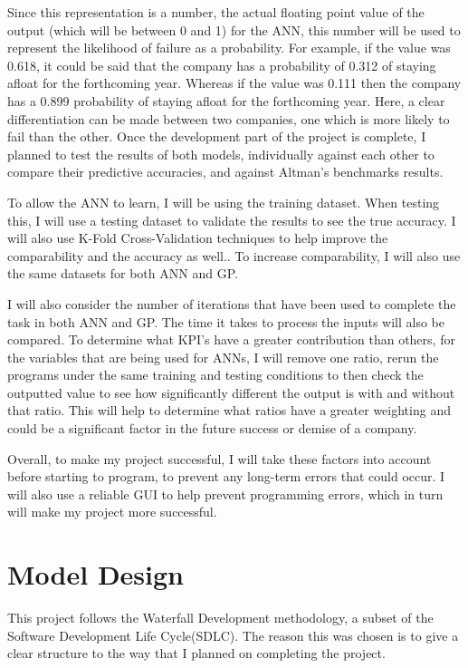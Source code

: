 \documentclass[11pt]{article}
\begin{document}
Since this representation is a number, the actual floating point value of the output (which will be between 0 and 1) for the ANN, this number will be used to represent the likelihood of failure as a probability. For example, if the value was 0.618, it could be said that the company has a probability of 0.312 of staying afloat for the forthcoming year. Whereas if the value was 0.111 then the company has a 0.899 probability of staying afloat for the forthcoming year. Here, a clear differentiation can be made between two companies, one which is more likely to fail than the other.
Once the development part of the project is complete, I planned to test the results of both models, individually against each other to compare their predictive accuracies, and against Altman's benchmarks results.

To allow the ANN to learn, I will be using the training dataset. When testing this, I will use a testing dataset to validate the results to see the true accuracy. I will also use K-Fold Cross-Validation techniques to help improve the comparability and the accuracy as well.. To increase comparability, I will also use the same datasets for both ANN and GP.

I will also consider the number of iterations that have been used to complete the task in both ANN and GP. The time it takes to process the inputs will also be compared. To determine what KPI's have a greater contribution than others, for the variables that are being used for ANNs, I will remove one ratio, rerun the programs under the same training and testing conditions to then check the outputted value to see how significantly different the output is with and without that ratio. This will help to determine what ratios have a greater weighting and could be a significant factor in the future success or demise of a company. 

Overall, to make my project successful, I will take these factors into account before starting to program, to prevent any long-term errors that could occur. I will also use a reliable GUI to help prevent programming errors, which in turn will make my project more successful. 
\section{Model Design}
This project follows the Waterfall Development methodology, a subset of the Software Development Life Cycle(SDLC). The reason this was chosen is to give a clear structure to the way that I planned on completing the project. 
\end{document}
